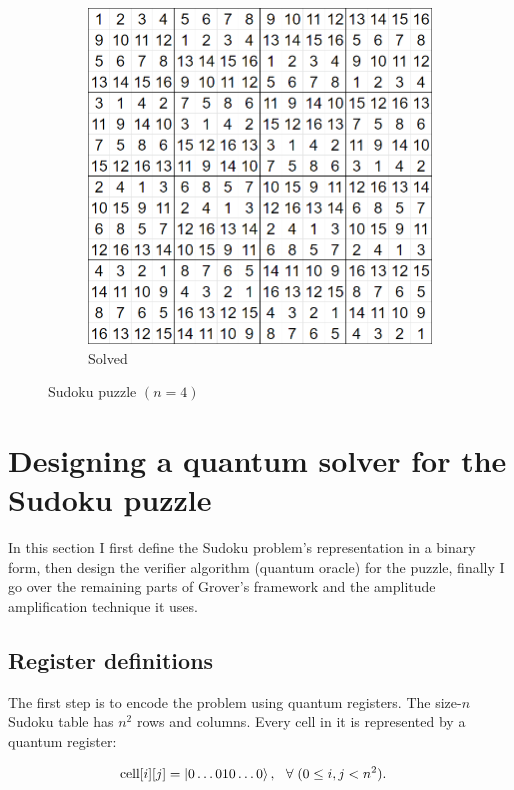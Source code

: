 \begin{figure}[H]
\begin{subfigure}{.49\linewidth}
    \includegraphics[width=\linewidth]{content/assets/03_grovers_algorithm/sudoku_4_solution.png}
    \caption{Solved}
  \end{subfigure}
  \caption{Sudoku puzzle $(n=4)$}
\end{figure}

\section{Designing a quantum solver for the Sudoku puzzle}

In this section I first define the Sudoku problem's representation in a binary form, then design the verifier algorithm (quantum oracle) for the puzzle, finally I go over the remaining parts of Grover's framework and the amplitude amplification technique it uses.

\subsection{Register definitions}

The first step is to encode the problem using quantum registers. The size-$n$ Sudoku table has $n^2$ rows and columns. Every cell in it is represented by a quantum register:

\begin{align*}
\text{cell}[i][j] = \ket{0\dots{}010\dots{}0}, & \hspace{3mm}\forall{}\hspace{1mm}(0\leq{}i,j<n^2).
\end{align*}


